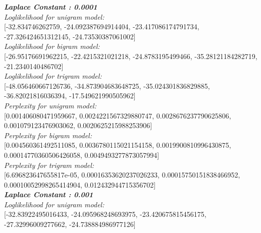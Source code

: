 \documentclass[11ppt]{article}
\begin{document}
\textit{\textbf{Laplace Constant : 0.0001 }}\\ \vspace{2mm}
\textit{Loglikelihood for unigram model:} \\ \vspace{1mm}  [-32.834746262759, -24.092387694914404, -23.417086174791734, -27.326424651312145, -24.73530387061002]  \\ \vspace{2mm}
\textit{Loglikelihood for bigram model:} \\ \vspace{1mm}  [-26.95176691962215, -22.4215321021218, -24.8783195499466, -35.28121184282719, -21.2340140486702]  \\ \vspace{2mm}
\textit{Loglikelihood for trigram model:} \\ \vspace{1mm}  [-48.056460667126736, -34.873904683648725, -35.024301836829885, -36.82021816036394, -17.549621990505962]  \\ \vspace{2mm}
\textit{Perplexity for unigram model:} \\ \vspace{1mm}  [0.001406080471959667, 0.0024221567329880747, 0.0028676237790625806, 0.001079123476903062, 0.0020625215988253906]  \\ \vspace{2mm}
\textit{Perplexity for bigram model:} \\ \vspace{1mm}  [0.004560361492511085, 0.0036780115021154158, 0.0019900810996430875, 0.00014770360506426058, 0.0049493277873057994]  \\ \vspace{2mm}
\textit{Perplexity for trigram model:} \\ \vspace{1mm}  [6.696823647655817e-05, 0.00016353620237026233, 0.00015750151838466952, 0.00010052998265414904, 0.012432944715356702]  \\ \vspace{2mm}
\textit{\textbf{Laplace Constant : 0.001 }}\\ \vspace{2mm}
\textit{Loglikelihood for unigram model:} \\ \vspace{1mm}  [-32.83922495016433, -24.095968248693975, -23.420675815456175, -27.32996009277662, -24.738884986977126]  \\ \vspace{2mm}
\end{document}
